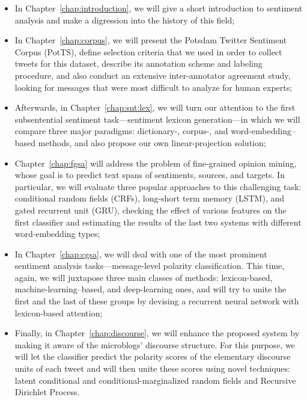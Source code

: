 \begin{itemize}
\item In Chapter~\ref{chap:introduction}, we will give a short
  introduction to sentiment analysis and make a digression into the
  history of this field;

\item In Chapter~\ref{chap:corpus}, we will present the Potsdam
  Twitter Sentiment Corpus (PotTS), define selection criteria that we
  used in order to collect tweets for this dataset, describe its
  annotation scheme and labeling procedure, and also conduct an
  extensive inter-annotator agreement study, looking for messages that
  were most difficult to analyze for human experts;

\item Afterwards, in Chapter~\ref{chap:snt:lex}, we will turn our
  attention to the first subsentential sentiment task---sentiment
  lexicon generation---in which we will compare three major paradigms:
  dictionary-, corpus-, and word-embedding--based methods, and also
  propose our own linear-projection solution;

\item Chapter~\ref{chap:fgsa} will address the problem of fine-grained
  opinion mining, whose goal is to predict text spans of sentiments,
  sources, and targets.  In particular, we will evaluate three popular
  approaches to this challenging task: conditional random fields
  (CRFs), long-short term memory (LSTM), and gated recurrent unit
  (GRU), checking the effect of various features on the first
  classifier and estimating the results of the last two systems with
  different word-embedding types;

\item In Chapter~\ref{chap:cgsa}, we will deal with one of the most
  prominent sentiment analysis tasks---message-level polarity
  classification.  This time, again, we will juxtapose three main
  classes of methods: lexicon-based, machine-learning--based, and
  deep-learning ones, and will try to unite the first and the last of
  these groups by devising a recurrent neural network with
  lexicon-based attention;

\item Finally, in Chapter~\ref{chap:discourse}, we will enhance the
  proposed system by making it aware of the microblogs' discourse
  structure.  For this purpose, we will let the classifier predict the
  polarity scores of the elementary discourse units of each tweet and
  will then unite these scores using novel techniques: latent
  conditional and conditional-marginalized random fields and Recursive
  Dirichlet Process.
\end{itemize}
